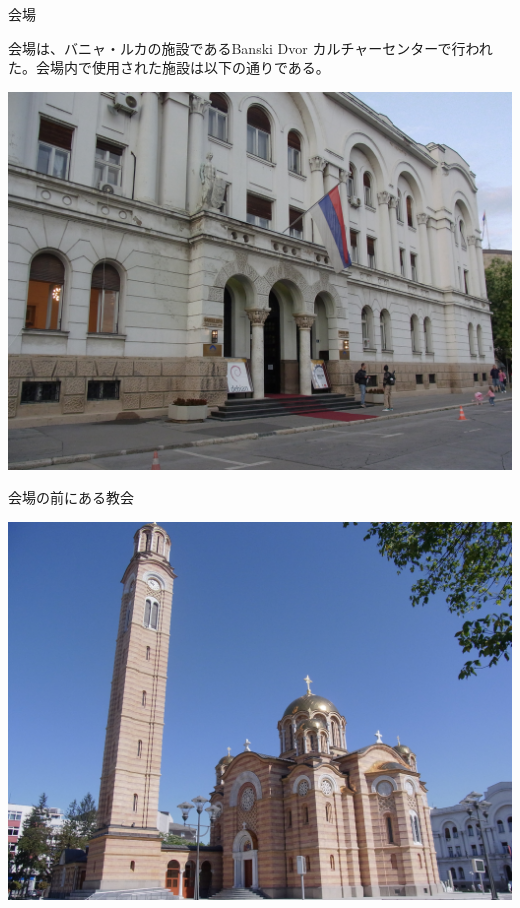 \begin{frame}{会場}

会場は、バニャ・ルカの施設であるBanski Dvor カルチャーセンターで行われ
た。会場内で使用された施設は以下の通りである。
\begin{center}
\includegraphics[width=0.8\hsize]{image201108/debconf11_venue1.jpg}
\end{center}
\end{frame}

\begin{frame}{会場の前にある教会}
\begin{center}
\includegraphics[width=0.8\hsize]{image201108/debconf11_venue2.jpg}
\end{center}
\end{frame}

